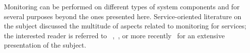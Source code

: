 Monitoring can be performed on different types of system components and for several purposes beyond the ones presented here. Service-oriented literature on the subject discussed the multitude of aspects related to monitoring for services; the interested reader is referred to ~\cite{ghezzi2007run},~\cite{metzger2010analytical}, or more recently~\cite{pernici2016monitoring} for an extensive presentation of the subject. 





